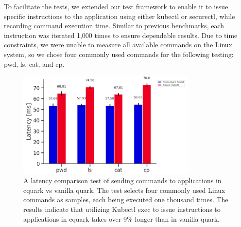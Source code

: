 To facilitate the tests, we extended our test framework to enable it to issue specific instructions to the application using either kubectl or securectl, while recording command execution time. Similar to previous benchmarks, each instruction was iterated 1,000 times to ensure dependable results. 
Due to time constraints, we were unable to measure all available commands on the Linux system, so we chose four commonly used commands for the following testing: pwd, ls, cat, and cp.


\begin{figure}[H]
    \centering
    \includegraphics[width=0.8\textwidth]{images/speed_of_issuing_cmd_in_cquark_upstream_quark.PNG}
    \caption[Benchmark result - Latency Comparison of sending Commands to Application in Cquark vs vanilla Quark]{A latency comparison test of sending commands to applications in cquark vs vanilla quark.  The test selects four 
    commonly used Linux commands as samples, each being executed one thousand times. The results indicate that utilizing Kubectl exec to issue instructions to applications in cquark takes over 9\% longer than in vanilla quark.
    }
    \label{fig:speed_of_issuing_cmd_in_cquark_upstream_quark}
\end{figure}




